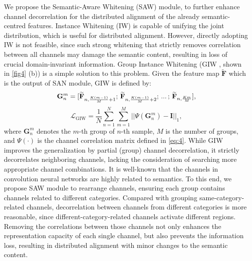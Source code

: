 \documentclass[10pt,twocolumn,letterpaper]{article}
\begin{document}
We propose the Semantic-Aware Whitening (SAW) module, to further enhance channel decorrelation for the distributed alignment of the already semantic-centred features.
Instance Whitening (IW) is capable of unifying the joint distribution, which is useful for distributed alignment. However, directly adopting IW is not feasible, since such strong whitening that strictly removes correlation between all channels may damage the semantic content, resulting in loss of crucial domain-invariant information. Group Instance Whitening (GIW \cite{cho2019image}, shown in \cref{fig4} (b)) is a simple solution to this problem. Given the feature map $\widetilde{\mathbf{F}}$ which is the output of SAN module, GIW is defined by:
\vspace{-0.8mm}
\begin{equation}
\mathbf{G}_{n}^{m}=[\mathbf{\widetilde{F}}_{n,\frac{K(m-1)}{M}+1};\thinspace\mathbf{\widetilde{F}}_{n,\frac{K(m-1)}{M}+2};\thinspace...\thinspace;\thinspace\mathbf{\widetilde{F}}_{n,\frac{Km}{M}}],\label{eq:14}
\end{equation}
\begin{equation}
\mathcal{L}_{\mathrm{GIW}}=\frac{1}{N}\sum_{n=1}^{N}\sum_{m=1}^{M}||\Psi(\mathbf{G}_{n}^{m})-\mathbf{I}||_{1},
\end{equation}
where $\mathbf{G}_{n}^{m}$ denotes the $m$-th group of $n$-th sample, $M$ is the number of groups, and $\Psi(\cdot)$ is the channel correlation matrix defined in \cref{eq:4}. While GIW improves the generalization by partial (group) channel decorrelation, it strictly decorrelates neighboring channels, lacking the consideration of searching more appropriate channel combinations. It is well-known that the channels in convolution neural networks are highly related to semantics. To this end, we propose SAW module to rearrange channels, ensuring each group contains channels related to different categories. Compared with grouping same-category-related channels, decorrelation between channels from different categories is more reasonable, since different-category-related channels activate different regions. Removing the correlations between those channels not only enhances the representation capacity of each single channel, but also prevents the information loss, resulting in distributed alignment with minor changes to the semantic content.
\end{document}
